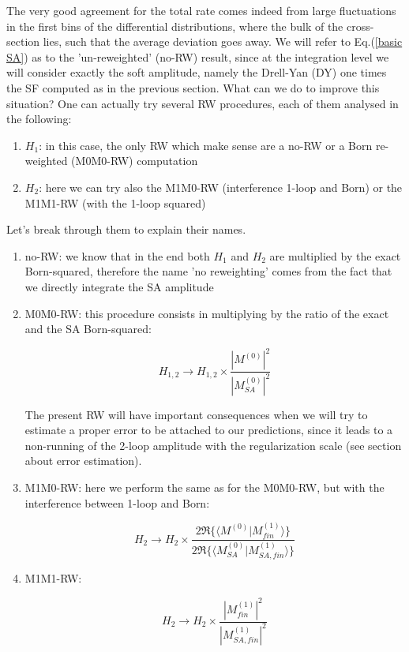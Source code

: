 \documentclass{report}
\begin{document}
The very good agreement for the total rate comes indeed from large fluctuations in the first bins of the differential distributions, where the bulk of the cross-section lies, such that the average deviation goes away.
We will refer to Eq.(\ref{basic SA}) as to the 'un-reweighted' (no-RW) result, since at the integration level we will consider exactly the soft amplitude, namely the Drell-Yan (DY) one times the SF computed as in the previous section.
What can we do to improve this situation? One can actually try several RW procedures, each of them analysed in the following:

\begin{enumerate}
    \item $H_1$: in this case, the only RW which make sense are a no-RW or a Born re-weighted (M0M0-RW) computation
    \item $H_2$: here we can try also the M1M0-RW (interference 1-loop and Born) or the M1M1-RW (with the 1-loop squared)
\end{enumerate}

Let's break through them to explain their names.

\begin{enumerate}
    \item no-RW: we know that in the end both $H_1$ and $H_2$ are multiplied by the exact Born-squared, therefore the name 'no reweighting' comes from the fact that we directly integrate the SA amplitude
    \item M0M0-RW: this procedure consists in multiplying by the ratio of the exact and the SA Born-squared:
    
    \begin{equation}
        H_{1,2} \longrightarrow H_{1,2}\times\frac{\left|M^{(0)}\right|^2}{\left|M_{SA}^{(0)}\right|^2}
    \end{equation}

    The present RW will have important consequences when we will try to estimate a proper error to be attached to our predictions, since it leads to a non-running of the 2-loop amplitude with the regularization scale (see section about error estimation).

    \item M1M0-RW: here we perform the same as for the M0M0-RW, but with the interference between 1-loop and Born:
    
    \begin{equation}
        H_2 \longrightarrow H_2\times\frac{2\Re\{\langle M^{(0)}|M_{fin}^{(1)}\rangle\}}{2\Re\{\langle M_{SA}^{(0)}|M_{SA, fin}^{(1)}\rangle\}}
    \end{equation}

    \item M1M1-RW: 

    \begin{equation}
        H_2 \longrightarrow H_2\times\frac{\left| M_{fin}^{(1)}\right|^2}{\left| M_{SA, fin}^{(1)}\right|^2}
    \end{equation}

\end{enumerate}
\end{document}
